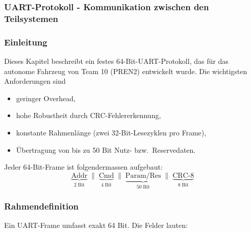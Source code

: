 \documentclass[main.tex]{subfiles} %
\begin{document}
\subsubsection{UART-Protokoll - Kommunikation zwischen den Teilsystemen}

\subsubsection*{Einleitung}
Dieses Kapitel beschreibt ein festes 64-Bit-UART-Protokoll, das für
das autonome Fahrzeug von Team 10 (PREN2) entwickelt wurde. Die
wichtigsten Anforderungen sind
\begin{itemize}
  \item geringer Overhead,
  \item hohe Robustheit durch CRC-Fehlererkennung,
  \item konstante Rahmenlänge (zwei 32-Bit-Lesezyklen pro Frame),
  \item Übertragung von bis zu 50 Bit Nutz- bzw.\ Reservedaten.
\end{itemize}

\bigskip
Jeder 64-Bit-Frame ist folgendermassen aufgebaut:
\[
  \underbrace{\text{Addr}}_{2\;\text{Bit}}
  \;\|\;
  \underbrace{\text{Cmd}}_{4\;\text{Bit}}
  \;\|\;
  \underbrace{\text{Param/Res}}_{50\;\text{Bit}}
  \;\|\;
  \underbrace{\text{CRC-8}}_{8\;\text{Bit}}
\]

\subsubsection*{Rahmendefinition}
Ein UART-Frame umfasst exakt 64 Bit. Die Felder lauten:
\end{document}
